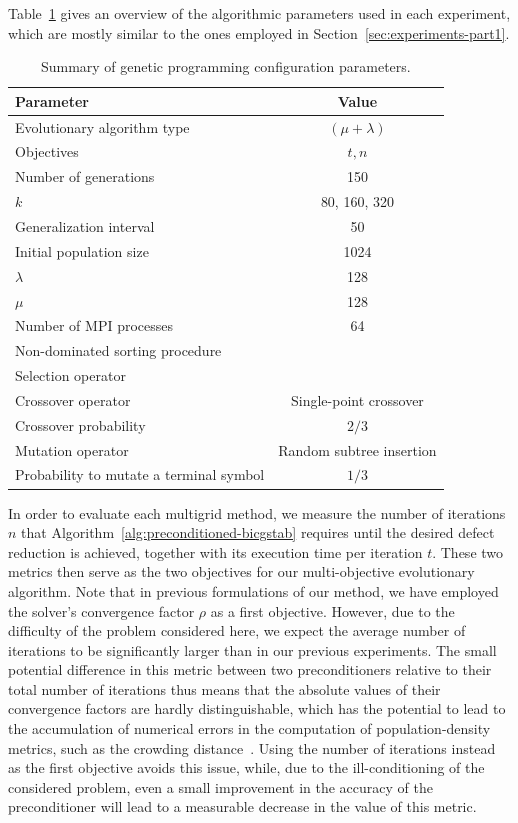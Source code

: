 Table~\ref{table:gp-parameters-helmholtz} gives an overview of the algorithmic parameters used in each experiment, which are mostly similar to the ones employed in Section~\ref{sec:experiments-part1}.
\begin{table}
	\centering
	\caption{Summary of genetic programming configuration parameters.}
	\label{table:gp-parameters-helmholtz}
	\begin{tabular}{l c}
		\toprule
		Parameter & Value \\
		\midrule 
		Evolutionary algorithm type & $(\mu + \lambda)$ \\
		\midrule
		Objectives & $t, n$ \\
		\midrule
		Number of generations & 150 \\
		\midrule
		$k$ & 80, 160, 320 \\
		\midrule
		Generalization interval & 50 \\
		\midrule
		Initial population size & 1024 \\
		\midrule
		$\lambda$ & 128 \\
		\midrule
		$\mu$ & 128 \\
		\midrule
		Number of MPI processes & 64 \\
		\midrule
		Non-dominated sorting procedure & \cite{deb2002fast} \\ 
		\midrule
		Selection operator & \cite{deb2002fast} \\ 
		\midrule
		Crossover operator & Single-point crossover \\
		\midrule
		Crossover probability & $2/3$ \\
		\midrule
		Mutation operator & Random subtree insertion \\
		\midrule 
		Probability to mutate a terminal symbol & $1/3$ \\
		\bottomrule
	\end{tabular}
\end{table}
In order to evaluate each multigrid method, we measure the number of iterations $n$ that Algorithm~\ref{alg:preconditioned-bicgstab} requires until the desired defect reduction is achieved, together with its execution time per iteration $t$.
These two metrics then serve as the two objectives for our multi-objective evolutionary algorithm.
Note that in previous formulations of our method, we have employed the solver's convergence factor $\rho$ as a first objective.
However, due to the difficulty of the problem considered here, we expect the average number of iterations to be significantly larger than in our previous experiments. 
The small potential difference in this metric between two preconditioners relative to their total number of iterations thus means that the absolute values of their convergence factors are hardly distinguishable, which has the potential to lead to the accumulation of numerical errors in the computation of population-density metrics, such as the crowding distance~\cite{deb2002fast}.
Using the number of iterations instead as the first objective avoids this issue, while, due to the ill-conditioning of the considered problem, even a small improvement in the accuracy of the preconditioner will lead to a measurable decrease in the value of this metric.

